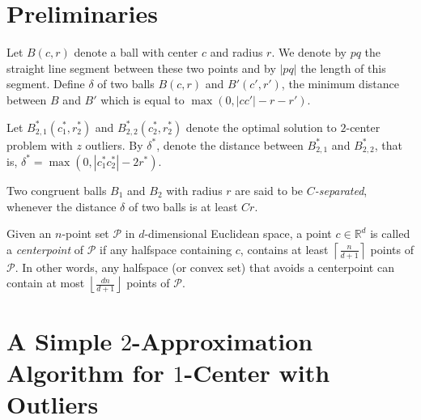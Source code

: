 \documentclass[envcountsame]{cls/cccg15}
\newcommand{\IR}{\ensuremath{\mathbb{R}}}
\newcommand{\ceil}[1]{\left\lceil{#1}\right\rceil}
\newcommand{\floor}[1]{\left\lfloor{#1}\right\rfloor}
\newcommand{\card}[1]{\left|{#1}\right|}
\begin{document}

\section{Preliminaries}
\label{sec:pre}
Let $B(c,r)$ denote a ball with center $c$ and radius $r$. We denote by $pq$ the straight line segment between these two points and by $\card{pq}$ the length of this segment. 
Define $\delta$ of two balls $B(c,r)$ and $B'(c',r')$, the minimum distance between $B$ and $B'$ which is equal to $\max (0, \card{cc'}-r-r')$.

Let $B_{2,1}^*(c_1^*, r_2^*)$ and $B_{2,2}^*(c_2^*, r_2^*)$ denote the optimal solution to $2$-center problem with $z$ outliers. By $\delta^*$, denote the distance between $B_{2,1}^*$ and $B_{2,2}^*$, that is, $\delta^* = \max (0, \card{c_1^*c_2^*} - 2r^*)$. 

Two congruent balls $B_1$ and $B_2$ with radius $r$ are said to be \emph{$C$-separated}, whenever the distance $\delta$ of two balls is at least $Cr$.



Given an $n$-point set $\mathcal{P}$ in $d$-dimensional Euclidean space, a point $c \in \IR^d$ is called a \emph{centerpoint} of $\mathcal{P}$ if any halfspace containing $c$, contains at least $\ceil{\frac{n}{d + 1}}$ points of $\mathcal{P}$. In other words, any halfspace (or convex set) that avoids a centerpoint can contain at most $\floor{\frac{dn}{d + 1}}$ points of $\mathcal{P}$.



\section{A Simple $2$-Approximation Algorithm for $1$-Center with Outliers}
\end{document}
